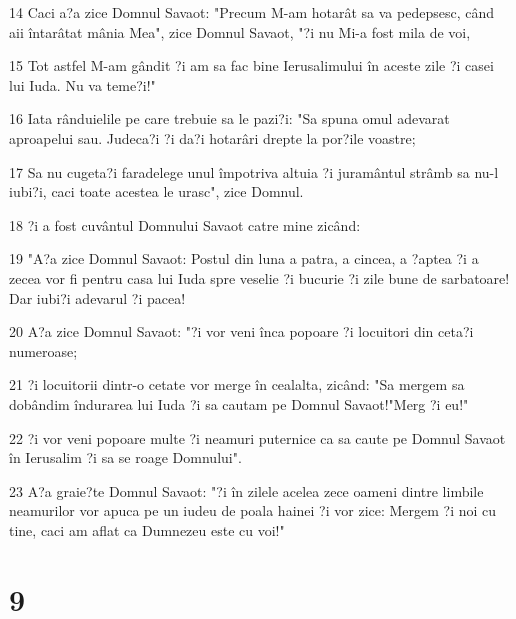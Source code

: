 \par 14 Caci a?a zice Domnul Savaot: "Precum M-am hotarât sa va pedepsesc, când aii întarâtat mânia Mea", zice Domnul Savaot, "?i nu Mi-a fost mila de voi,
\par 15 Tot astfel M-am gândit ?i am sa fac bine Ierusalimului în aceste zile ?i casei lui Iuda. Nu va teme?i!"
\par 16 Iata rânduielile pe care trebuie sa le pazi?i: "Sa spuna omul adevarat aproapelui sau. Judeca?i ?i da?i hotarâri drepte la por?ile voastre;
\par 17 Sa nu cugeta?i faradelege unul împotriva altuia ?i juramântul strâmb sa nu-l iubi?i, caci toate acestea le urasc", zice Domnul.
\par 18 ?i a fost cuvântul Domnului Savaot catre mine zicând:
\par 19 "A?a zice Domnul Savaot: Postul din luna a patra, a cincea, a ?aptea ?i a zecea vor fi pentru casa lui Iuda spre veselie ?i bucurie ?i zile bune de sarbatoare! Dar iubi?i adevarul ?i pacea!
\par 20 A?a zice Domnul Savaot: "?i vor veni înca popoare ?i locuitori din ceta?i numeroase;
\par 21 ?i locuitorii dintr-o cetate vor merge în cealalta, zicând: "Sa mergem sa dobândim îndurarea lui Iuda ?i sa cautam pe Domnul Savaot!"Merg ?i eu!"
\par 22 ?i vor veni popoare multe ?i neamuri puternice ca sa caute pe Domnul Savaot în Ierusalim ?i sa se roage Domnului".
\par 23 A?a graie?te Domnul Savaot: "?i în zilele acelea zece oameni dintre limbile neamurilor vor apuca pe un iudeu de poala hainei ?i vor zice: Mergem ?i noi cu tine, caci am aflat ca Dumnezeu este cu voi!"

\chapter{9}

